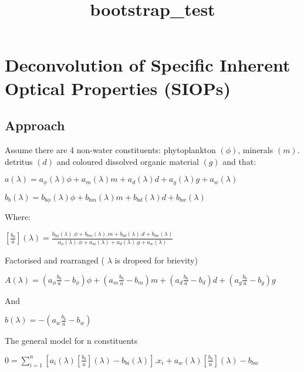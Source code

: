 \documentclass{article}
\title{bootstrap\_test}
\begin{document}
    
    
    \maketitle
    
    

    
    \subsection{}\label{section}

\section{Deconvolution of Specific Inherent Optical Properties
(SIOPs)}\label{deconvolution-of-specific-inherent-optical-properties-siops}

\subsection{Approach}\label{approach}

Assume there are 4 non-water constituents: phytoplankton $(\phi)$,
minerals $(m)$. detritus $(d)$ and coloured dissolved organic material
$(g)$ and that:

$a(\lambda) = a_\phi(\lambda)\phi + a_m(\lambda)m + a_d(\lambda)d + a_g(\lambda)g + a_w(\lambda)$

$b_b(\lambda) = b_{b\phi}(\lambda)\phi + b_{bm}(\lambda)m + b_{bd}(\lambda)d + b_{bw}(\lambda)$

Where:

$\left[\frac{b_b}{a}\right](\lambda) = \frac{b_{b\phi}(\lambda).\phi + b_{bm}(\lambda).m + b_{bd}(\lambda).d + b_{bw}(\lambda)}{a_\phi(\lambda).\phi + a_m(\lambda) + a_d(\lambda).g + a_w(\lambda)}$

Factorised and rearranged ( $\lambda$ is dropeed for brievity)

$A(\lambda) = \left(a_\phi\frac{b_b}{a} - b_\phi \right)\phi + \left(a_m\frac{b_b}{a} - b_m \right)m + \left(a_d\frac{b_b}{a} - b_d \right)d + \left(a_g\frac{b_b}{a} - b_g \right)g$

And

$b(\lambda) = -\left(a_w\frac{b_b}{a} - b_w \right)$

The general model for n constituents

$0 = \sum\limits_{i=1}^n\left[a_i(\lambda)\left[ \frac{b_b}{a}\right](\lambda) - b_{bi}(\lambda)  \right].x_i + a_w(\lambda)\left[\frac{b_b}{a}\right](\lambda) - b_{bw} $
\end{document}

